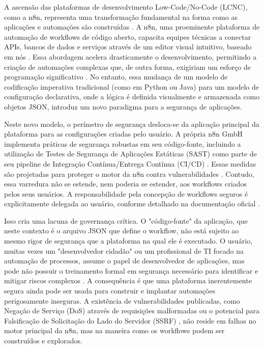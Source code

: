 \documentclass{sftex}
\begin{document}
A ascensão das plataformas de desenvolvimento Low-Code/No-Code (LCNC), como a n8n, representa uma transformação fundamental na forma como as aplicações e automações são construídas \cite{owasp_lcnc_top10}. A n8n, uma proeminente plataforma de automação de workflows de código aberto, capacita equipes técnicas a conectar APIs, bancos de dados e serviços através de um editor visual intuitivo, baseado em nós \cite{n8n_platform}. Essa abordagem acelera drasticamente o desenvolvimento, permitindo a criação de automações complexas que, de outra forma, exigiriam um esforço de programação significativo \cite{n8n_essential_tricks}. No entanto, essa mudança de um modelo de codificação imperativa tradicional (como em Python ou Java) para um modelo de configuração declarativa, onde a lógica é definida visualmente e armazenada como objetos JSON, introduz um novo paradigma para a segurança de aplicações.

Neste novo modelo, o perímetro de segurança desloca-se da aplicação principal da plataforma para as configurações criadas pelo usuário. A própria n8n GmbH implementa práticas de segurança robustas em seu código-fonte, incluindo a utilização de Testes de Segurança de Aplicações Estáticas (SAST) como parte de seu pipeline de Integração Contínua/Entrega Contínua (CI/CD) \cite{n8n_github_security}. Essas medidas são projetadas para proteger o motor da n8n contra vulnerabilidades \cite{n8n_security}. Contudo, essa varredura não se estende, nem poderia se estender, aos workflows criados pelos seus usuários. A responsabilidade pela concepção de workflows seguros é explicitamente delegada ao usuário, conforme detalhado na documentação oficial \cite{n8n_privacy}.

Isso cria uma lacuna de governança crítica. O "código-fonte" da aplicação, que neste contexto é o arquivo JSON que define o workflow, não está sujeito ao mesmo rigor de segurança que a plataforma na qual ele é executado. O usuário, muitas vezes um "desenvolvedor cidadão" ou um profissional de TI focado na automação de processos, assume o papel de desenvolvedor de aplicações, mas pode não possuir o treinamento formal em segurança necessário para identificar e mitigar riscos complexos \cite{michel_n8n_security}. A consequência é que uma plataforma inerentemente segura ainda pode ser usada para construir e implantar automações perigosamente inseguras. A existência de vulnerabilidades publicadas, como Negação de Serviço (DoS) através de requisições malformadas \cite{cve_2023_27562} ou o potencial para Falsificação de Solicitação do Lado do Servidor (SSRF) \cite{ssrf_tutorial}, não reside em falhas no motor principal da n8n, mas na maneira como os workflows podem ser construídos e explorados.
\end{document}
